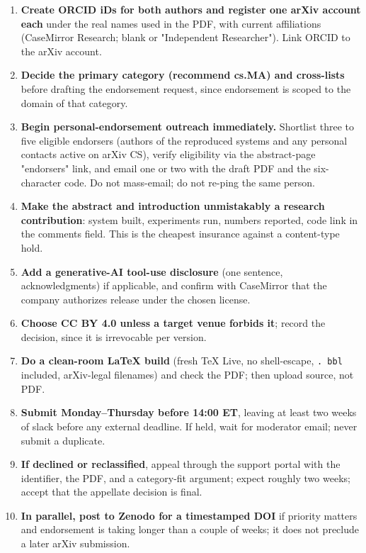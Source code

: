 \documentclass[twocolumn,10pt,letterpaper]{article}
\begin{document}
\begin{enumerate}
\setlength{\itemsep}{0pt}
\setlength{\parskip}{0pt}
  \item \textbf{Create ORCID iDs for both authors and register one arXiv account each} under the real names used in the PDF, with current affiliations (CaseMirror Research; blank or "Independent Researcher"). Link ORCID to the arXiv account.
  \item \textbf{Decide the primary category (recommend cs.MA) and cross-lists} before drafting the endorsement request, since endorsement is scoped to the domain of that category.
  \item \textbf{Begin personal-endorsement outreach immediately.} Shortlist three to five eligible endorsers (authors of the reproduced systems and any personal contacts active on arXiv CS), verify eligibility via the abstract-page "endorsers" link, and email one or two with the draft PDF and the six-character code. Do not mass-email; do not re-ping the same person.
  \item \textbf{Make the abstract and introduction unmistakably a research contribution}: system built, experiments run, numbers reported, code link in the comments field. This is the cheapest insurance against a content-type hold.
  \item \textbf{Add a generative-AI tool-use disclosure} (one sentence, acknowledgments) if applicable, and confirm with CaseMirror that the company authorizes release under the chosen license.
  \item \textbf{Choose CC BY 4.0 unless a target venue forbids it}; record the decision, since it is irrevocable per version.
  \item \textbf{Do a clean-room LaTeX build} (fresh TeX Live, no shell-escape, \texttt{. bbl} included, arXiv-legal filenames) and check the PDF; then upload source, not PDF.
  \item \textbf{Submit Monday–Thursday before 14:00 ET}, leaving at least two weeks of slack before any external deadline. If held, wait for moderator email; never submit a duplicate.
  \item \textbf{If declined or reclassified}, appeal through the support portal with the identifier, the PDF, and a category-fit argument; expect roughly two weeks; accept that the appellate decision is final.
  \item \textbf{In parallel, post to Zenodo for a timestamped DOI} if priority matters and endorsement is taking longer than a couple of weeks; it does not preclude a later arXiv submission.
\end{enumerate}
\end{document}
